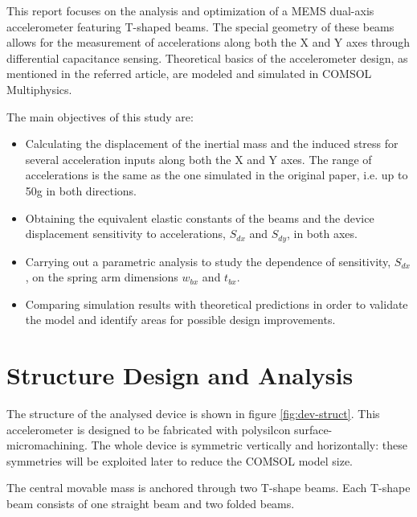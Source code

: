 \documentclass[lettersize,journal]{IEEEtran}
\begin{document}
        This report focuses on the analysis and optimization of a MEMS dual-axis accelerometer featuring T-shaped beams. The special geometry of these beams allows for the measurement of accelerations along both the X and Y axes through differential capacitance sensing. Theoretical basics of the accelerometer design, as mentioned in the referred article, are modeled and simulated in COMSOL Multiphysics.
        
        The main objectives of this study are:
        \begin{itemize}
        \item Calculating the displacement of the inertial mass and the induced stress for several acceleration inputs along both the X and Y axes. The range of accelerations is the same as the one simulated in the original paper, i.e. up to 50g in both directions.
        \item Obtaining the equivalent elastic constants of the beams and the device displacement sensitivity to accelerations, \(S_{dx}\) and \(S_{dy}\), in both axes.
        \item Carrying out a parametric analysis to study the dependence of sensitivity, \(S_{dx}\), on the spring arm dimensions \(w_{bx}\) and \(t_{bx}\).
        \item Comparing simulation results with theoretical predictions in order to validate the model and identify areas for possible design improvements.
        \end{itemize}
        
    \section{Structure Design and Analysis}
        The structure of the analysed device is shown in figure \ref{fig:dev-struct}. This accelerometer is designed to be fabricated with polysilcon surface-micromachining. The whole device is symmetric vertically and horizontally: these symmetries will be exploited later to reduce the COMSOL model size.
        
        The central movable mass is anchored through two T-shape beams. Each T-shape beam consists of one straight beam and two folded beams.
        
\end{document}

